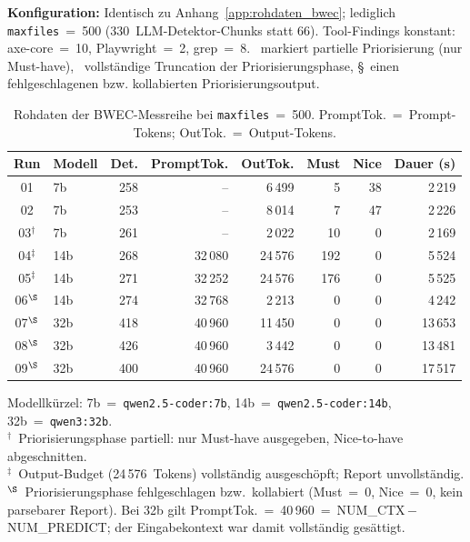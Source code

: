 \noindent\textbf{Konfiguration:} Identisch zu Anhang~\ref{app:rohdaten_bwec}; lediglich \texttt{maxfiles}~=~500 (330~\ac{LLM}-Detektor-Chunks statt 66). Tool-Findings konstant: axe-core~=~10, Playwright~=~2, grep~=~8. \dag~markiert partielle Priorisierung (nur Must-have), \ddag~vollständige Truncation der Priorisierungsphase, \S~einen fehlgeschlagenen bzw. kollabierten Priorisierungsoutput.

\begin{table}[htbp]
\centering
\setlength{\tabcolsep}{4pt}
\renewcommand{\arraystretch}{1.2}
\caption[Rohdaten \ac{BWEC} (\texttt{maxfiles}=500)]{Rohdaten der \ac{BWEC}-Messreihe bei \texttt{maxfiles}~=~500. PromptTok.~=~Prompt-Tokens; OutTok.~=~Output-Tokens.}
\small
\begin{tabular}{|c|l|r|r|r|r|r|r|}
\hline
\textbf{Run} & \textbf{Modell} & \textbf{Det.} & \textbf{PromptTok.} & \textbf{OutTok.} & \textbf{Must} & \textbf{Nice} & \textbf{Dauer (s)} \\
\hline
01 & 7b              & 258 & --       &  6\,499 &   5 & 38 &  2\,219 \\
\hline
02 & 7b              & 253 & --       &  8\,014 &   7 & 47 &  2\,226 \\
\hline
03$^{\dag}$ & 7b     & 261 & --       &  2\,022 &  10 &  0 &  2\,169 \\
\hline
04$^{\ddag}$ & 14b   & 268 & 32\,080  & 24\,576 & 192 &  0 &  5\,524 \\
\hline
05$^{\ddag}$ & 14b   & 271 & 32\,252  & 24\,576 & 176 &  0 &  5\,525 \\
\hline
06$^{\S}$ & 14b      & 274 & 32\,768  &  2\,213 &   0 &  0 &  4\,242 \\
\hline
07$^{\S}$ & 32b      & 418 & 40\,960  & 11\,450 &   0 &  0 & 13\,653 \\
\hline
08$^{\S}$ & 32b      & 426 & 40\,960  &  3\,442 &   0 &  0 & 13\,481 \\
\hline
09$^{\S}$ & 32b      & 400 & 40\,960  & 24\,576 &   0 &  0 & 17\,517 \\
\hline
\end{tabular}
\label{tab:rohdaten_bwec500}
\end{table}

{\footnotesize\noindent
Modellkürzel: 7b~=~\texttt{qwen2.5-coder:7b}, 14b~=~\texttt{qwen2.5-coder:14b}, 32b~=~\texttt{qwen3:32b}.\\
$^{\dag}$~Priorisierungsphase partiell: nur Must-have ausgegeben, Nice-to-have abgeschnitten.\\
$^{\ddag}$~Output-Budget (24\,576~Tokens) vollständig ausgeschöpft; Report unvollständig.\\
$^{\S}$~Priorisierungsphase fehlgeschlagen bzw.\ kollabiert (Must~=~0, Nice~=~0, kein parsebarer Report). Bei 32b gilt PromptTok.~=~40\,960~=~NUM\_CTX\,$-$\,NUM\_PREDICT; der Eingabekontext war damit vollständig gesättigt.
}

